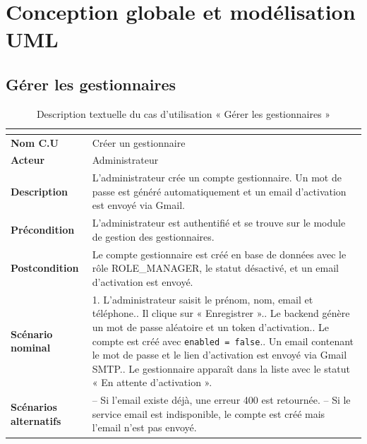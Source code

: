 \documentclass[12pt,a4paper]{report}
\numberwithin{figure}{chapter}
\numberwithin{table}{chapter}
\begin{document}
\section{Conception globale et modélisation UML}



\subsection{Gérer les gestionnaires}

\begin{table}[H]
  \centering
  \caption{Description textuelle du cas d'utilisation « Gérer les gestionnaires »}
  \label{tab:cu_managers}
  \renewcommand{\arraystretch}{1.4}
  \begin{tabularx}{\textwidth}{|>{\bfseries}l|L|}
    \hline
     \\
    \hline
    Nom C.U & Créer un gestionnaire \\
    \hline
    Acteur & Administrateur \\
    \hline
    Description & L'administrateur crée un compte gestionnaire. Un mot de passe est généré
      automatiquement et un email d'activation est envoyé via Gmail. \\
    \hline
    Précondition & L'administrateur est authentifié et se trouve sur le module de gestion
      des gestionnaires. \\
    \hline
    Postcondition & Le compte gestionnaire est créé en base de données avec le rôle
      ROLE\_MANAGER, le statut désactivé, et un email d'activation est envoyé. \\
    \hline
    Scénario nominal &
      1. L'administrateur saisit le prénom, nom, email et téléphone.. Il clique sur « Enregistrer ».. Le backend génère un mot de passe aléatoire et un token d'activation.. Le compte est créé avec \texttt{enabled = false}.. Un email contenant le mot de passe et le lien d'activation est envoyé via Gmail SMTP.. Le gestionnaire apparaît dans la liste avec le statut « En attente d'activation ». \\
    \hline
    Scénarios alternatifs &
      -- Si l'email existe déjà, une erreur 400 est retournée.\newline
      -- Si le service email est indisponible, le compte est créé mais l'email n'est pas envoyé. \\
    \hline
  \end{tabularx}
\end{table}
\end{document}
